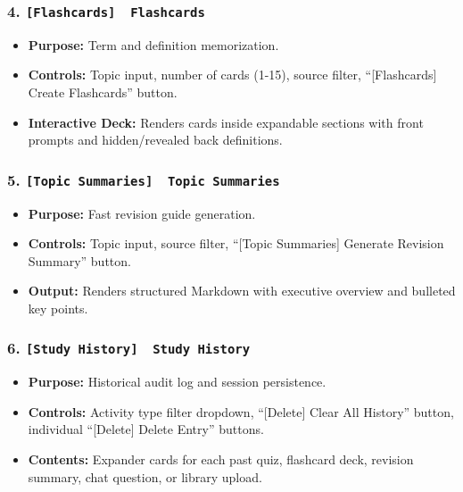 \documentclass[
]{article}
\providecommand{\tightlist}{%
  \setlength{\itemsep}{0pt}\setlength{\parskip}{0pt}}
\begin{document}
\subsubsection{\texorpdfstring{4.
\texttt{{[}Flashcards{]}\ \allowbreak \ \allowbreak Flashcards}}{4. {[}Flashcards{]}  Flashcards}}\label{flashcards-flashcards}

\begin{itemize}
\tightlist
\item
  \textbf{Purpose:} Term and definition memorization.
\item
  \textbf{Controls:} Topic input, number of cards (1-15), source filter,
  ``{[}Flashcards{]} Create Flashcards'' button.
\item
  \textbf{Interactive Deck:} Renders cards inside expandable sections
  with front prompts and hidden/revealed back definitions.
\end{itemize}

\subsubsection{\texorpdfstring{5.
\texttt{{[}Topic\ \allowbreak Summaries{]}\ \allowbreak \ \allowbreak Topic\ \allowbreak Summaries}}{5. {[}Topic Summaries{]}  Topic Summaries}}\label{topic-summaries-topic-summaries}

\begin{itemize}
\tightlist
\item
  \textbf{Purpose:} Fast revision guide generation.
\item
  \textbf{Controls:} Topic input, source filter, ``{[}Topic Summaries{]}
  Generate Revision Summary'' button.
\item
  \textbf{Output:} Renders structured Markdown with executive overview
  and bulleted key points.
\end{itemize}

\subsubsection{\texorpdfstring{6.
\texttt{{[}Study\ \allowbreak History{]}\ \allowbreak \ \allowbreak Study\ \allowbreak History}}{6. {[}Study History{]}  Study History}}\label{study-history-study-history}

\begin{itemize}
\tightlist
\item
  \textbf{Purpose:} Historical audit log and session persistence.
\item
  \textbf{Controls:} Activity type filter dropdown, ``{[}Delete{]} Clear
  All History'' button, individual ``{[}Delete{]} Delete Entry''
  buttons.
\item
  \textbf{Contents:} Expander cards for each past quiz, flashcard deck,
  revision summary, chat question, or library upload.
\end{itemize}
\end{document}
